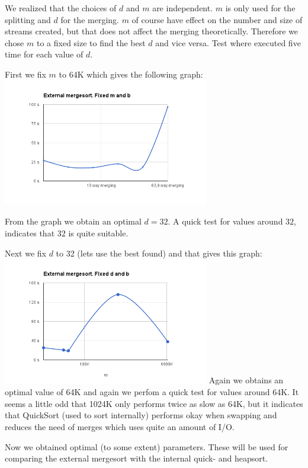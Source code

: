 We realized that the choices of $d$ and $m$ are independent. $m$ is only used for the splitting and $d$ for the merging. $m$ of course have effect on the number and size of streams created, but that does not affect the merging theoretically. Therefore we chose $m$ to a fixed size to find the best $d$ and vice versa. Test where executed five time for each value of $d$.

First we fix $m$ to 64K which gives the following graph:
\includegraphics[width=90mm]{graphics/MergeSortFixedM.png}

From the graph we obtain an optimal $d = 32$. A quick test for values around $32$, indicates that $32$ is quite suitable.

Next we fix $d$ to 32 (lets use the best found) and that gives this graph:
\includegraphics[width=90mm]{graphics/MergeSortFixedD.png}
Again we obtains an optimal value of 64K and again we perfom a quick test for values around 64K. It seems a little odd that 1024K only performs twice as slow as 64K, but it indicates that QuickSort (used to sort internally) performs okay when swapping and reduces the need of merges which uses quite an amount of I/O.

Now we obtained optimal (to some extent) parameters. These will be used for comparing the external mergesort with the internal quick- and heapsort.



